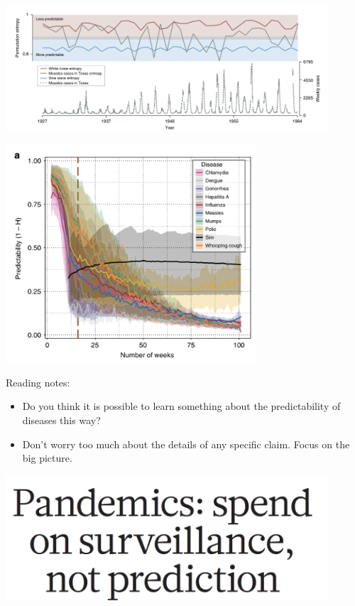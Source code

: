 \documentclass[aspectratio=169]{beamer}
\begin{document}
\begin{frame}

\begin{center}
\includegraphics[width = 0.9\textwidth]{figures/scarpino_on_2019_fig1}
\end{center}

\end{frame}
\begin{frame}

\begin{center}
\includegraphics[width = 0.7\textwidth]{figures/scarpino_on_2019_fig2a}
\end{center}

\end{frame}
\begin{frame}

Reading notes:
\begin{itemize}
\item Do you think it is possible to learn something about the predictability of diseases this way?
\pause
\item Don't worry too much about the details of any specific claim. Focus on the big picture.
\end{itemize}

\end{frame}
\begin{frame}

\begin{center}
\includegraphics[width = 0.9\textwidth]{figures/holmes_pandemics_2018_title}
\end{center}

\end{frame}
\frame{\titlepage}
\end{document}

